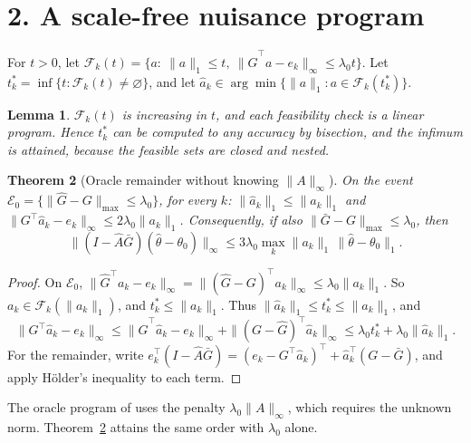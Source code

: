 \documentclass[11pt]{article}
\newtheorem{theorem}{Theorem}
\newtheorem{lemma}[theorem]{Lemma}
\theoremstyle{definition}
\begin{document}
\section*{2. A scale-free nuisance program}
For $t>0$, let $\mathcal F_k(t)=\{a:\ \|a\|_1\le t,\ \|\widehat G^\top a-e_k\|_\infty\le\lambda_0t\}$. Let
$t_k^*=\inf\{t:\mathcal F_k(t)\neq\varnothing\}$, and let $\widehat a_k\in\arg\min\{\|a\|_1:a\in\mathcal F_k(t_k^*)\}$.
\begin{lemma}\label{lem:mono}
$\mathcal F_k(t)$ is increasing in $t$, and each feasibility check is a linear program. Hence $t_k^*$ can be computed to
any accuracy by bisection, and the infimum is attained, because the feasible sets are closed and nested.
\end{lemma}
\begin{theorem}[Oracle remainder without knowing $\|A\|_\infty$]\label{thm:sf}
On the event $\mathcal E_0=\{\|\widehat G-G\|_{\max}\le\lambda_0\}$, for every $k$: $\|\widehat a_k\|_1\le\|a_k\|_1$ and
$\|G^\top\widehat a_k-e_k\|_\infty\le2\lambda_0\|a_k\|_1$. Consequently, if also
$\|\bar G-G\|_{\max}\le\lambda_0$, then
\[
 \|(I-\widehat A\bar G)(\widehat\theta-\theta_0)\|_\infty\le3\lambda_0\max_k\|a_k\|_1\,\|\widehat\theta-\theta_0\|_1.
\]
\end{theorem}
\begin{proof}
On $\mathcal E_0$, $\|\widehat G^\top a_k-e_k\|_\infty=\|(\widehat G-G)^\top a_k\|_\infty\le\lambda_0\|a_k\|_1$. So
$a_k\in\mathcal F_k(\|a_k\|_1)$, and $t_k^*\le\|a_k\|_1$. Thus $\|\widehat a_k\|_1\le t_k^*\le\|a_k\|_1$, and
\[
\|G^\top\widehat a_k-e_k\|_\infty\le\|\widehat G^\top\widehat a_k-e_k\|_\infty+\|(G-\widehat G)^\top\widehat a_k\|_\infty
\le\lambda_0t_k^*+\lambda_0\|\widehat a_k\|_1.
\]
For the remainder, write $e_k^\top(I-\widehat A\bar G)=(e_k-G^\top\widehat a_k)^\top+\widehat a_k^\top(G-\bar G)$, and apply
H\"older's inequality to each term.
\end{proof}
The oracle program of \cite{bcchk} uses the penalty $\lambda_0\|A\|_\infty$, which requires the unknown norm. Theorem~\ref{thm:sf}
attains the same order with $\lambda_0$ alone.
\end{document}
